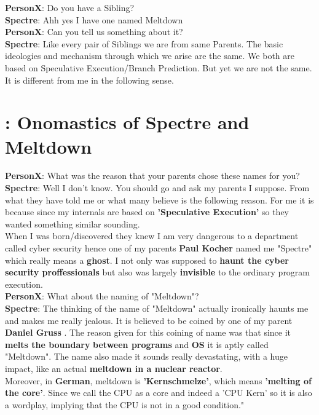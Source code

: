 \documentclass[12pt]{article}
\begin{document}
\begin{appendices}
	\textbf{PersonX}: Do you have a Sibling?\\
	
	\textbf{Spectre}: Ahh yes I have one named Meltdown\\
	
	\textbf{PersonX}: Can you tell us something about it?\\
	
	\textbf{Spectre}: Like every pair of Siblings we are from same Parents. The basic ideologies and mechanism through which we arise are the same. We both are based on Speculative Execution/Branch Prediction. But yet we are not the same. It is different from me in the following sense.
	
	\section{:  Onomastics of Spectre and Meltdown \cite{NameOrigin}}
	
	\textbf{PersonX}: What was the reason that your parents chose these names for you?\\
	
	\textbf{Spectre}: Well I don't know. You should go and ask my parents I suppose. From what they have told me or what many believe is the following reason. For me it is because since my internals are based on \textbf{'Speculative Execution'}  so they wanted something similar sounding.\\ When I was born/discovered they knew I am very dangerous to a department called cyber security hence one of my parents \textbf{Paul Kocher} named me "Spectre" which really means a \textbf{ghost}. I not only was supposed to \textbf{haunt the cyber security proffessionals} but also was largely \textbf{invisible} to the ordinary program execution.\\
	
	\textbf{PersonX}: What about the naming of "Meltdown"?\\
	
	\textbf{Spectre}: The thinking of the name of "Meltdown" actually ironically haunts me and makes me really jealous. It is believed to be coined by one of my parent \textbf{Daniel Gruss} . The reason given for this coining of name was that since it \textbf{melts the boundary} \textbf{between programs} and \textbf{OS} it is aptly called "Meltdown". The name also made it sounds really devastating, with a huge impact, like an actual \textbf{meltdown in a nuclear reactor}.\\
	Moreover, in \textbf{German}, meltdown is \textbf{'Kernschmelze'}, which means \textbf{'melting of the core'}. Since we call the CPU as a core and indeed a 'CPU Kern' so it is also a wordplay, implying that the CPU is not in a good condition."



\end{appendices}
\end{document}
